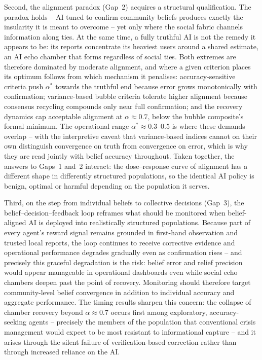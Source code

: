 \documentclass[pdflatex,sn-nature]{sn-jnl}
\begin{document}
Second, the alignment paradox (Gap~2) \citep{west2025alignment} acquires a structural qualification. The paradox holds -- AI tuned to confirm community beliefs produces exactly the insularity it is meant to overcome -- yet only where the social fabric channels information along ties. At the same time, a fully truthful AI is not the remedy it appears to be: its reports concentrate its heaviest users around a shared estimate, an AI echo chamber that forms regardless of social ties. Both extremes are therefore dominated by moderate alignment, and where a given criterion places its optimum follows from which mechanism it penalises: accuracy-sensitive criteria push $\alpha^{*}$ towards the truthful end because error grows monotonically with confirmation; variance-based bubble criteria tolerate higher alignment because consensus recycling compounds only near full confirmation; and the recovery dynamics cap acceptable alignment at $\alpha \approx 0.7$, below the bubble composite's formal minimum. The operational range $\alpha^{*} \approx 0.3$--$0.5$ is where these demands overlap -- with the interpretive caveat that variance-based indices cannot on their own distinguish convergence on truth from convergence on error, which is why they are read jointly with belief accuracy throughout. Taken together, the answers to Gaps~1 and~2 interact: the dose--response curve of alignment has a different shape in differently structured populations, so the identical AI policy is benign, optimal or harmful depending on the population it serves.

Third, on the step from individual beliefs to collective decisions (Gap~3), the belief--decision--feedback loop reframes what should be monitored when belief-aligned AI is deployed into realistically structured populations. Because part of every agent's reward signal remains grounded in first-hand observation and trusted local reports, the loop continues to receive corrective evidence and operational performance degrades gradually even as confirmation rises -- and precisely this graceful degradation is the risk: belief error and relief precision would appear manageable in operational dashboards even while social echo chambers deepen past the point of recovery. Monitoring should therefore target community-level belief convergence in addition to individual accuracy and aggregate performance. The timing results sharpen this concern: the collapse of chamber recovery beyond $\alpha \approx 0.7$ occurs first among exploratory, accuracy-seeking agents -- precisely the members of the population that conventional crisis management would expect to be most resistant to informational capture \citep{comes2020coordination} -- and it arises through the silent failure of verification-based correction rather than through increased reliance on the AI.
\end{document}
